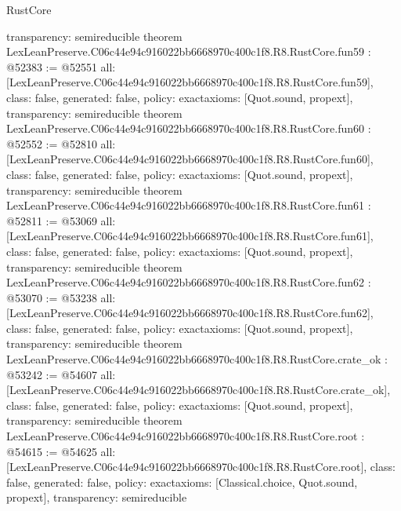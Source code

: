 \begin{lexlean}{RustCore}
\begin{coremodule}
{  transparency: semireducible
}
theorem LexLeanPreserve.C06c44e94c916022bb6668970c400c1f8.R8.RustCore.fun59 : @52383 := @52551 {
  all: [LexLeanPreserve.C06c44e94c916022bb6668970c400c1f8.R8.RustCore.fun59],
  class: false,
  generated: false,
  policy: exact{axioms: [Quot.sound, propext]},
  transparency: semireducible
}
theorem LexLeanPreserve.C06c44e94c916022bb6668970c400c1f8.R8.RustCore.fun60 : @52552 := @52810 {
  all: [LexLeanPreserve.C06c44e94c916022bb6668970c400c1f8.R8.RustCore.fun60],
  class: false,
  generated: false,
  policy: exact{axioms: [Quot.sound, propext]},
  transparency: semireducible
}
theorem LexLeanPreserve.C06c44e94c916022bb6668970c400c1f8.R8.RustCore.fun61 : @52811 := @53069 {
  all: [LexLeanPreserve.C06c44e94c916022bb6668970c400c1f8.R8.RustCore.fun61],
  class: false,
  generated: false,
  policy: exact{axioms: [Quot.sound, propext]},
  transparency: semireducible
}
theorem LexLeanPreserve.C06c44e94c916022bb6668970c400c1f8.R8.RustCore.fun62 : @53070 := @53238 {
  all: [LexLeanPreserve.C06c44e94c916022bb6668970c400c1f8.R8.RustCore.fun62],
  class: false,
  generated: false,
  policy: exact{axioms: [Quot.sound, propext]},
  transparency: semireducible
}
theorem LexLeanPreserve.C06c44e94c916022bb6668970c400c1f8.R8.RustCore.crate_ok : @53242 := @54607 {
  all: [LexLeanPreserve.C06c44e94c916022bb6668970c400c1f8.R8.RustCore.crate_ok],
  class: false,
  generated: false,
  policy: exact{axioms: [Quot.sound, propext]},
  transparency: semireducible
}
theorem LexLeanPreserve.C06c44e94c916022bb6668970c400c1f8.R8.RustCore.root : @54615 := @54625 {
  all: [LexLeanPreserve.C06c44e94c916022bb6668970c400c1f8.R8.RustCore.root],
  class: false,
  generated: false,
  policy: exact{axioms: [Classical.choice, Quot.sound, propext]},
  transparency: semireducible
}


\end{coremodule}
\end{lexlean}
